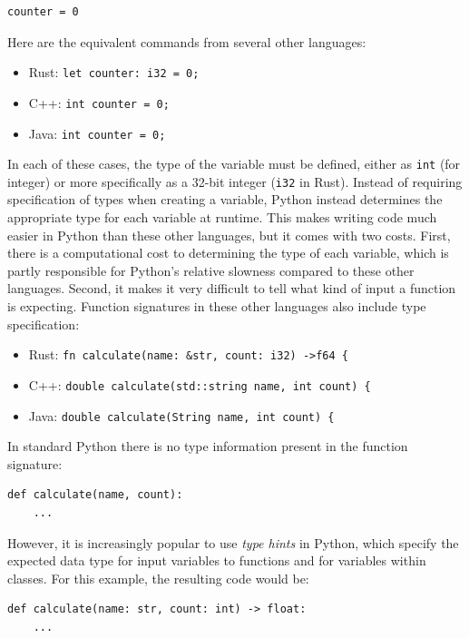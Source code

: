 \begin{lstlisting}[style=Pythonshort]
counter = 0
\end{lstlisting}

Here are the equivalent commands from several other languages:

\begin{itemize}
\item Rust: \texttt{let counter: i32 = 0;}
\item C++: \texttt{int counter = 0;}
\item Java: \texttt{int counter = 0;}
\end{itemize}

In each of these cases, the type of the variable must be defined, either as \texttt{int} (for integer) or more specifically as a 32-bit integer (\texttt{i32} in Rust).  Instead of requiring specification of types when creating a variable, Python instead determines the appropriate type for each variable at runtime.  This makes writing code much easier in Python than these other languages, but it comes with two costs. First, there is a computational cost to determining the type of each variable, which is partly responsible for Python's relative slowness compared to these other languages.  Second, it makes it very difficult to tell what kind of input a function is expecting.  Function signatures in these other languages also include type specification:

\begin{itemize}
\item Rust: \texttt{fn calculate(name: \&str, count: i32) -\textgreater  f64 \{}
\item C++: \texttt{double calculate(std::string name, int count) \{}
\item Java: \texttt{double calculate(String name, int count) \{}
\end{itemize}

In standard Python there is no type information present in the function signature:

\begin{lstlisting}[style=Pythonshort]
def calculate(name, count):
    ...
\end{lstlisting}

However, it is increasingly popular to use \textit{type hints} in Python, which specify the expected data type for input variables to functions and for variables within classes.  For this example, the resulting code would be:

\begin{lstlisting}[style=Pythonshort]
def calculate(name: str, count: int) -> float:
    ...
\end{lstlisting}

